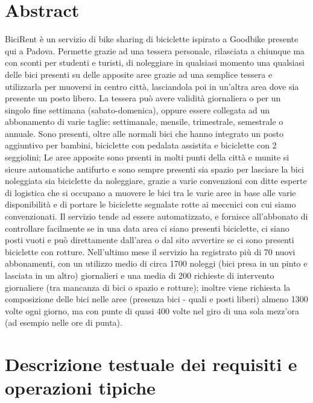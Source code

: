 \documentclass[a4paper,twoside]{article}
\begin{document}
\section{Abstract}
BiciRent è un servizio di bike sharing di biciclette ispirato a Goodbike presente qui a Padova.\newline
Permette grazie ad una tessera personale, rilasciata a chiunque ma con sconti per studenti e turisti, di noleggiare in qualsiasi momento una qualsiasi delle bici presenti su delle apposite aree grazie ad una semplice tessera e utilizzarla per muoversi in centro città, lasciandola poi in un'altra area dove sia presente un posto libero.\newline
La tessera può avere validità giornaliera o per un singolo fine settimana (sabato-domenica), oppure essere collegata ad un abbonamento di varie taglie: settimanale, mensile, trimestrale, semestrale o  annuale.\newline
Sono presenti, oltre alle normali bici che hanno integrato un posto aggiuntivo per bambini, biciclette con pedalata assistita e biciclette con 2 seggiolini;\newline
Le aree apposite sono prsenti in molti punti della città e munite si sicure automatiche antifurto e sono sempre presenti sia spazio per lasciare la bici noleggiata sia biciclette da noleggiare, grazie a varie convenzioni con ditte esperte di logistica che si occupano a muovere le bici tra le varie aree in base alle varie disponibilità e di portare le biciclette segnalate rotte ai meccnici con cui siamo convenzionati.\newline
Il servizio tende ad essere automatizzato, e fornisce all'abbonato di controllare facilmente se in una data area ci siano presenti biciclette, ci siano posti vuoti e può direttamente dall'area o dal sito avvertire se ci sono presenti biciclette con rotture.\newline
Nell'ultimo mese il servizio ha registrato più di 70 nuovi abbonamenti, con un utilizzo medio di circa 1700 noleggi (bici presa in un pinto e lasciata in un altro) giornalieri e una media di 200 richieste di intervento giornaliere (tra mancanza di bici o spazio e rotture);\newline
inoltre viene richiesta la composizione delle bici nelle aree (presenza bici - quali e posti liberi) almeno 1300 volte ogni giorno, ma con punte di quasi 400 volte nel giro di una sola mezz'ora (ad esempio nelle ore di punta).

\section{Descrizione testuale dei requisiti e operazioni tipiche}
\end{document}
